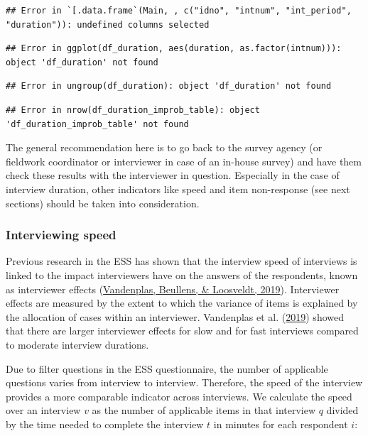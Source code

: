\documentclass[
  11pt,
  a4paperpaper,
]{article}
\begin{document}
\begin{verbatim}
## Error in `[.data.frame`(Main, , c("idno", "intnum", "int_period", "duration")): undefined columns selected
\end{verbatim}

\begin{verbatim}
## Error in ggplot(df_duration, aes(duration, as.factor(intnum))): object 'df_duration' not found
\end{verbatim}

\begin{verbatim}
## Error in ungroup(df_duration): object 'df_duration' not found
\end{verbatim}

\begin{verbatim}
## Error in nrow(df_duration_improb_table): object 'df_duration_improb_table' not found
\end{verbatim}

The general recommendation here is to go back to the survey agency (or
fieldwork coordinator or interviewer in case of an in-house survey) and
have them check these results with the interviewer in question.
Especially in the case of interview duration, other indicators like
speed and item non-response (see next sections) should be taken into
consideration.

\newpage

\hypertarget{sec:speed}{%
\subsubsection{Interviewing speed}\label{sec:speed}}

Previous research in the ESS has shown that the interview speed of
interviews is linked to the impact interviewers have on the answers of
the respondents, known as interviewer effects
(\protect\hyperlink{ref-vandenplas2019}{Vandenplas, Beullens, \&
Loosveldt, 2019}). Interviewer effects are measured by the extent to
which the variance of items is explained by the allocation of cases
within an interviewer. Vandenplas et al.
(\protect\hyperlink{ref-vandenplas2019}{2019}) showed that there are
larger interviewer effects for slow and for fast interviews compared to
moderate interview durations.

Due to filter questions in the ESS questionnaire, the number of
applicable questions varies from interview to interview. Therefore, the
speed of the interview provides a more comparable indicator across
interviews. We calculate the speed over an interview \(v\) as the number
of applicable items in that interview \(q\) divided by the time needed
to complete the interview \(t\) in minutes for each respondent \(i\):
\end{document}

